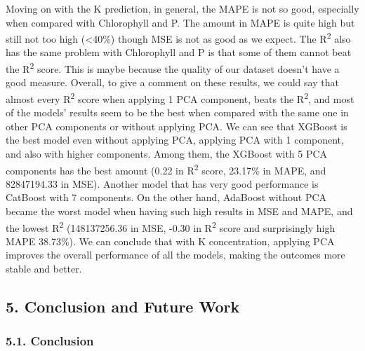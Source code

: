 \documentclass[
]{article}
\begin{document}
Moving on with the K prediction, in general, the MAPE is not so good,
especially when compared with Chlorophyll and P. The amount in MAPE is
quite high but still not too high (\textless40\%) though MSE is not as
good as we expect. The R\textsuperscript{2} also has the same problem
with Chlorophyll and P is that some of them cannot beat the
R\textsuperscript{2} score. This is maybe because the quality of our
dataset doesn't have a good measure. Overall, to give a comment on these
results, we could say that almost every R\textsuperscript{2} score when
applying 1 PCA component, beats the R\textsuperscript{2}, and most of
the models' results seem to be the best when compared with the same one
in other PCA components or without applying PCA. We can see that XGBoost
is the best model even without applying PCA, applying PCA with 1
component, and also with higher components. Among them, the XGBoost with
5 PCA components has the best amount (0.22 in R\textsuperscript{2}
score, 23.17\% in MAPE, and 82847194.33 in MSE). Another model that has
very good performance is CatBoost with 7 components. On the other hand,
AdaBoost without PCA became the worst model when having such high
results in MSE and MAPE, and the lowest R\textsuperscript{2}
(148137256.36 in MSE, -0.30 in R\textsuperscript{2} score and
surprisingly high MAPE 38.73\%). We can conclude that with K
concentration, applying PCA improves the overall performance of all the
models, making the outcomes more stable and better.

\hypertarget{conclusion-and-future-work}{%
\subsection{\texorpdfstring{\textbf{5. Conclusion and Future Work}
}{5. Conclusion and Future Work }}\label{conclusion-and-future-work}}

\hypertarget{conclusion}{%
\subsubsection{\texorpdfstring{\textbf{5.1.
Conclusion}}{5.1. Conclusion}}\label{conclusion}}
\end{document}
